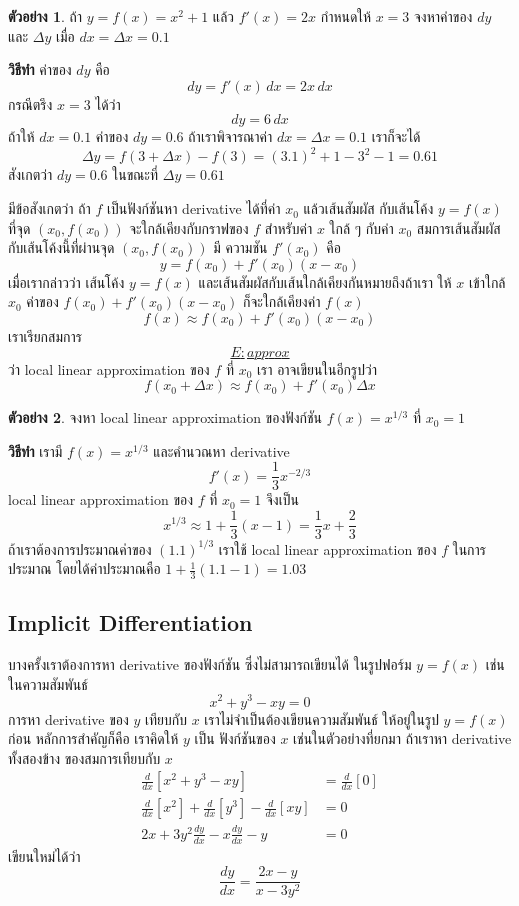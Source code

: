 \documentclass[
]{book}
\theoremstyle{definition}
\theoremstyle{definition}
\newtheorem{example}{ตัวอย่าง}[chapter]
\theoremstyle{definition}
\theoremstyle{definition}
\theoremstyle{remark}
\begin{document}
\begin{example}
ถ้า \(y = f(x) = x^2+1\) แล้ว \(f'(x) = 2x\) กำหนดให้ \(x=3\) จงหาค่าของ \(dy\) และ
\(\Delta y\) เมื่อ \(dx = \Delta x = 0.1\)
\end{example}

\textbf{วิธีทำ} ค่าของ \(dy\) คือ \[dy = f'(x) \,dx = 2x\,dx\] กรณีตรึง \(x=3\) ได้ว่า
\[dy = 6\,dx\] ถ้าให้ \(dx=0.1\) ค่าของ \(dy = 0.6\) ถ้าเราพิจารณาค่า
\(dx = \Delta x= 0.1\) เราก็จะได้
\[\Delta y = f(3+\Delta x) - f(3) = (3.1)^2+1 - 3^2-1 = 0.61\] สังเกตว่า
\(dy = 0.6\) ในขณะที่ \(\Delta y = 0.61\)

มีข้อสังเกตว่า ถ้า \(f\) เป็นฟังก์ชันหา derivative ได้ที่ค่า \(x_0\) แล้วเส้นสัมผัส กับเส้นโค้ง
\(y= f(x)\) ที่จุด \((x_0,f(x_0))\) จะใกล้เคียงกับกราฟของ \(f\) สำหรับค่า \(x\) ใกล้ ๆ
กับค่า \(x_0\) สมการเส้นสัมผัสกับเส้นโค้งนี้ที่ผ่านจุด \((x_0,f(x_0))\) มี ความชัน \(f'(x_0)\)
คือ \[y = f(x_0) + f'(x_0)(x-x_0)\] เมื่อเรากล่าวว่า เส้นโค้ง \(y=f(x)\)
และเส้นสัมผัสกับเส้นใกล้เคียงกันหมายถึงถ้าเรา ให้ \(x\) เข้าใกล้ \(x_0\) ค่าของ
\(f(x_0)+f'(x_0)(x-x_0)\) ก็จะใกล้เคียงค่า \(f(x)\) \[\label{E:approx}
    f(x) \approx  f(x_0) + f'(x_0)(x-x_0)\]
เราเรียกสมการ~\hyperref[E:approx]{\[E:approx\]} ว่า local linear approximation ของ \(f\) ที่ \(x_0\) เรา
อาจเขียนในอีกรูปว่า \[f(x_0 + \Delta x) \approx f(x_0) + f'(x_0)\Delta x\]

\begin{example}
จงหา local linear approximation ของฟังก์ชัน \(f(x) = x^{1/3}\) ที่ \(x_0 = 1\)
\end{example}

\textbf{วิธีทำ} เรามี \(f(x) = x^{1/3}\) และคำนวณหา derivative
\[f'(x) = \frac{1}{3}x^{-2/3}\] local linear approximation ของ \(f\) ที่
\(x_0 = 1\) จึงเป็น
\[x^{1/3} \approx 1 + \frac{1}{3}(x-1) = \frac{1}{3}x+\frac{2}{3}\]
ถ้าเราต้องการประมาณค่าของ \((1.1)^{1/3}\) เราใช้ local linear approximation
ของ \(f\) ในการประมาณ โดยได้ค่าประมาณคือ \(1+\frac{1}{3}(1.1-1) = 1.03\)

\subsection{Implicit Differentiation}\label{implicit-differentiation}

บางครั้งเราต้องการหา derivative ของฟังก์ชัน ซึ่งไม่สามารถเขียนได้ ในรูปฟอร์ม
\(y = f(x)\) เช่นในความสัมพันธ์ \[x^2+y^3 - xy = 0\] การหา derivative ของ \(y\)
เทียบกับ \(x\) เราไม่จำเป็นต้องเขียนความสัมพันธ์ ให้อยู่ในรูป \(y = f(x)\) ก่อน
หลักการสำคัญก็คือ เราคิดให้ \(y\) เป็น ฟังก์ชันของ \(x\) เช่นในตัวอย่างที่ยกมา ถ้าเราหา
derivative ทั้งสองข้าง ของสมการเทียบกับ \(x\)
\begin{equation}   \begin{aligned}
    \frac{d}{dx}[x^2+y^3-xy] &= \frac{d}{dx}[0] \\
    \frac{d}{dx}[x^2] + \frac{d}{dx}[y^3] - \frac{d}{dx}[xy] &= 0 \\
    2x + 3y^2 \frac{dy}{dx} - x\frac{dy}{dx} -y &= 0
  \end{aligned} \end{equation} เขียนใหม่ได้ว่า
\[\frac{dy}{dx} = \frac{2x-y}{x-3y^2}\]
\end{document}
